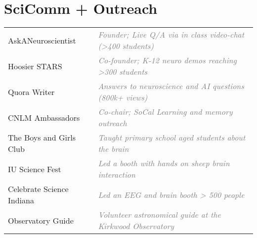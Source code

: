 \documentclass[10pt]{cooperCV2}
\begin{document}
\section{SciComm + Outreach}

\begin{longtable}{@{} l @{\extracolsep{\fill}}  l @{}}
	 
	AskANeuroscientist & \textcolor{grey}{ \textit{Founder; Live Q/A via in class video-chat (>400 students)}} \\
	 
	Hoosier STARS & \textcolor{grey}{ \textit{Co-founder; K-12 neuro demos reaching >300 students}} \\
	 
	Quora Writer & \textcolor{grey}{ \textit{Answers to neuroscience and AI questions (800k+ views)}} \\
	 
	CNLM Ambassadors & \textcolor{grey}{ \textit{Co-chair; SoCal Learning and memory outreach}} \\
	 
	The Boys and Girls Club & \textcolor{grey}{ \textit{Taught primary school aged students about the brain}} \\
	 
	IU Science Fest & \textcolor{grey}{ \textit{Led a booth with hands on sheep brain interaction}} \\
	 
	Celebrate Science Indiana & \textcolor{grey}{ \textit{Led an EEG and brain booth > 500 people}} \\
	 
	Observatory Guide & \textcolor{grey}{ \textit{Volunteer astronomical guide at the Kirkwood Observatory}} \\
	
\end{longtable}






%	





\end{document}
